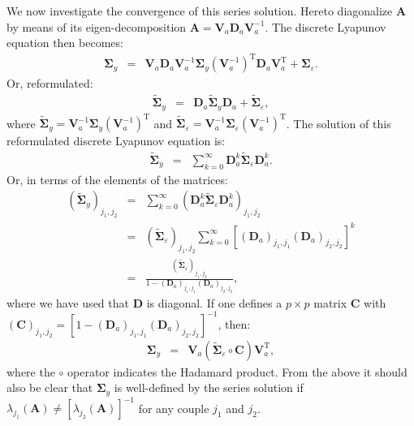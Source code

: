 \documentclass[a4paper]{article}
\theoremstyle{myexamplestyle}
\begin{document}
We now investigate the convergence of this series solution. Hereto diagonalize $\mathbf{A}$ by means of its eigen-decomposition $\mathbf{A} = \mathbf{V}_a \mathbf{D}_a \mathbf{V}^{-1}_a$. The discrete Lyapunov equation then becomes:
\begin{eqnarray*}
\mathbf{\Sigma}_{y} & = & \mathbf{V}_a \mathbf{D}_a \mathbf{V}^{-1}_a \mathbf{\Sigma}_{y} ( \mathbf{V}_a^{-1})^{\mathrm{T}} \mathbf{D}_a \mathbf{V}^{\mathrm{T}}_a  + \mathbf{\Sigma}_{\varepsilon}.
\end{eqnarray*}
Or, reformulated:
\begin{eqnarray*}
\tilde{\mathbf{\Sigma}}_{y} & = & \mathbf{D}_a  \tilde{\mathbf{\Sigma}}_{y} \mathbf{D}_a  + \tilde{\mathbf{\Sigma}}_{\varepsilon},
\end{eqnarray*}
where $\tilde{\mathbf{\Sigma}}_{y}  = \mathbf{V}_a^{-1}  \mathbf{\Sigma}_{y} (\mathbf{V}_a^{-1})^{\mathrm{T}}$ and $\tilde{\mathbf{\Sigma}}_{\varepsilon} = \mathbf{V}_a^{-1}  \mathbf{\Sigma}_{\varepsilon} (\mathbf{V}_a^{-1})^{\mathrm{T}}$. The solution of this reformulated discrete Lyapunov equation is:
\begin{eqnarray*}
\tilde{\mathbf{\Sigma}}_{y} & = & \sum_{k=0}^{\infty} \mathbf{D}_a^k \tilde{\mathbf{\Sigma}}_{\varepsilon} \mathbf{D}_a^k.
\end{eqnarray*}
Or, in terms of the elements of the matrices:
\begin{eqnarray*}
(\tilde{\mathbf{\Sigma}}_{y})_{j_1, j_2} & = & \sum_{k=0}^{\infty} (\mathbf{D}_a^k \tilde{\mathbf{\Sigma}}_{\varepsilon} \mathbf{D}_a^k)_{j_1, j_2}
\\
&  = & (\tilde{\mathbf{\Sigma}}_{\varepsilon})_{j_1, j_2} \sum_{k=0}^{\infty} [(\mathbf{D}_a)_{j_1, j_1}  (\mathbf{D}_a)_{j_2, j_2}]^k
\\
&  = &  \frac{(\tilde{\mathbf{\Sigma}}_{\varepsilon})_{j_1, j_2}}{ 1 - (\mathbf{D}_a)_{j_1, j_1}  (\mathbf{D}_a)_{j_2, j_2}},
\end{eqnarray*}
where we have used that $\mathbf{D}$ is diagonal. If one defines a $p \times p$ matrix $\mathbf{C}$ with $(\mathbf{C})_{j_1, j_2} = [1 - (\mathbf{D}_a)_{j_1, j_1}  (\mathbf{D}_a)_{j_2, j_2}]^{-1}$, then:
\begin{eqnarray*}
\mathbf{\Sigma}_y & = & \mathbf{V}_a (\tilde{\mathbf{\Sigma}}_{\varepsilon} \circ \mathbf{C}) \mathbf{V}_a^{\mathrm{T}},
\end{eqnarray*}
where the $\circ$ operator indicates the Hadamard product. From the above it should also be clear that $\mathbf{\Sigma}_y$ is well-defined by the series solution if $\lambda_{j_1}(\mathbf{A}) \not= [\lambda_{j_2}(\mathbf{A})]^{-1}$ for any couple $j_1$ and $j_2$.
\end{document}

